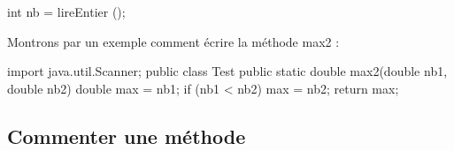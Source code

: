 \documentclass[11pt,a4paper]{article}
\begin{document}
            \par
        \begin{Java}

int nb = lireEntier ();
				\end{Java}Montrons par un exemple comment \'ecrire la m\'ethode max2 : 
            \par
        \begin{Java}

import java.util.Scanner;
public class Test{
  public static double max2(double nb1, double nb2){
    double max = nb1;
		if (nb1 < nb2) {
			max = nb2;
		}
		return max;
  }
}				\end{Java}\subsection{Commenter une m\'ethode}
\end{document}

